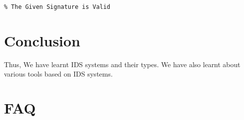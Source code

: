 \documentclass[11pt]{article}
\begin{document}
\begin{verbatim}
% The Given Signature is Valid
\end{verbatim}

% 

\section{Conclusion}
Thus, We have learnt IDS systems and their types. We have also learnt about various tools based on IDS systems.
\clearpage

\section{FAQ}
\end{document}

